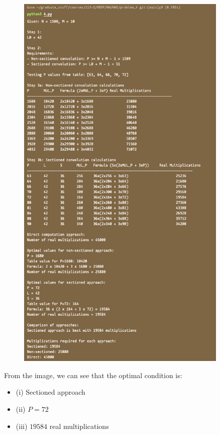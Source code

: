 \documentclass{article}
\begin{document}
\begin{figure}[H]
    \centering
    \includegraphics[width=0.9\textwidth]{problem_4/4_c.png}
\end{figure}

From the image, we can see that the optimal condition is: 
\begin{itemize}
    \item (i) Sectioned approach
    \item (ii) $P = 72$
    \item (iii) $19584$ real multiplications
\end{itemize}
\end{document}
